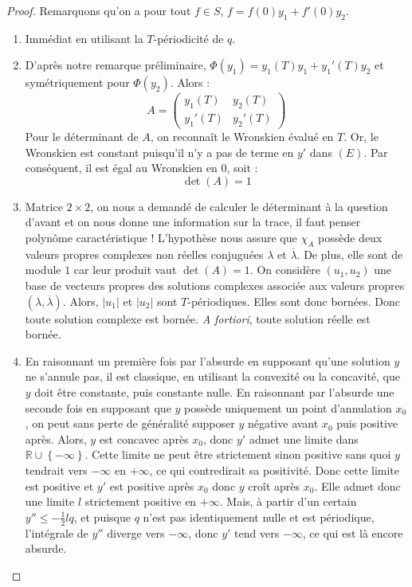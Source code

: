 \documentclass[french,a4paper]{article}
\newcommand{\R}{\mathbb{R}}
\theoremstyle{plain}
\theoremstyle{definition}
\theoremstyle{remark}
\begin{document}
\begin{proof}
	Remarquons qu'on a pour tout $f\in S$, $f=f(0)y_1+f'(0)y_2$.
	\begin{enumerate}
		\item Immédiat en utilisant la $T$-périodicité de $q$.
		\item D'après notre remarque préliminaire, $\Phi(y_1)=y_1(T)y_1+y_1'(T)y_2$ et symétriquement pour $\Phi(y_2)$. Alors : $$A=\begin{pmatrix}
			y_1(T)&y_2(T)\\
			y_1'(T)&y_2'(T)
		\end{pmatrix}$$ Pour le déterminant de $A$, on reconnaît le Wronskien évalué en $T$. Or, le Wronskien est constant puisqu'il n'y a pas de terme en $y'$ dans $(E)$. Par conséquent, il est égal au Wronskien en $0$, soit : $$\det(A)=1$$
		\item Matrice $2\times 2$, on nous a demandé de calculer le déterminant à la question d'avant et on nous donne une information sur la trace, il faut penser polynôme caractéristique ! L'hypothèse nous assure que $\chi_A$ possède deux valeurs propres complexes non réelles conjuguées $\lambda$ et $\overline{\lambda}$. De plus, elle sont de module $1$ car leur produit vaut $\det(A)=1$. On considère $(u_1,u_2)$ une base de vecteurs propres des solutions complexes associée aux valeurs propres $(\lambda,\overline{\lambda})$. Alors, $\lvert u_1\rvert$ et $\lvert u_2\rvert$ sont $T$-périodiques. Elles sont donc bornées. Donc toute solution complexe est bornée. \textit{A fortiori}, toute solution réelle est bornée.
		\item En raisonnant un première fois par l'absurde en supposant qu'une solution $y$ ne s'annule pas, il est classique, en utilisant la convexité ou la concavité, que $y$ doit être constante, puis constante nulle. En raisonnant par l'absurde une seconde fois en supposant que $y$ possède uniquement un point d'annulation $x_0$, on peut sans perte de généralité supposer $y$ négative avant $x_0$ puis positive après. Alors, $y$ est concavec après $x_0$, donc $y'$ admet une limite dans $\R\cup\left\{-\infty\right\}$. Cette limite ne peut être strictement sinon positive sans quoi $y$ tendrait vers $-\infty$ en $+\infty$, ce qui contredirait sa positivité. Donc cette limite est positive et $y'$ est positive après $x_0$ donc $y$ croît après $x_0$. Elle admet donc une limite $l$ strictement positive en $+\infty$. Mais, à partir d'un certain $y''\leqslant\displaystyle-\frac12 lq$, et puisque $q$ n'est pas identiquement nulle et est périodique, l'intégrale de $y''$ diverge vers $-\infty$, donc $y'$ tend vers $-\infty$, ce qui est là encore absurde.

\end{enumerate}
\end{proof}
\end{document}
